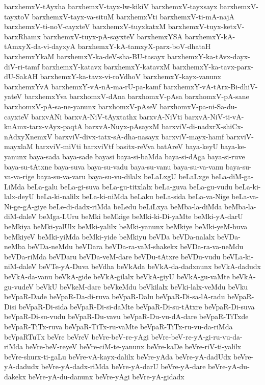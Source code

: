 {barxhemxV-tAyxha
barxhemxV-tayx-lw-kikiV
barxhemxV-tayxsayx
barxhemxV-tayxtoV
barxhemxV-tayx-va-situM
barxhemxVti
barxhemxV-ti-mA-najA
barxhemxV-ti-noV-cayxteV
barxhemxV-tuyxkatxM
barxhemxV-tuyx-ketxV-barxRhamx
barxhemxV-tuyx-pA-sayxteV
barxhemxYSA
barxhemxY-kA-tAmxyX-da-vi-dayxyA
barxhemxY-kA-tamxyX-parx-boV-dhataH
barxhemxYkaM
barxhemxY-ka-deV-sha-BU-tasayx
barxhemxY-ka-tAvx-dayx-diV-ri-tamf
barxhemxY-katavx
barxhemxY-katavxM
barxhemxY-ka-tavx-parx-dU-SakAH
barxhemxY-ka-tavx-vi-roVdhoV
barxhemxY-kayx-vanunx
barxhemxYvA
barxhemxY-vA-nA-ma-rU-pa-kamf
barxhemxY-vA-tArx-Bi-dhiV-yateV
barxhemxYva
barxhomxV-dAna
barxhomxV-pAsa
barxhomxV-pA-sane
barxhomxV-pA-sa-ne-yanunx
barxhomxV-pAseV
barxhomxV-pa-ni-Sa-du-cayxteV
barxvANi
barxvA-NiV-tAyxtathx
barxvA-NiVti
barxvA-NiV-ti-vA-knAmx-tarx-vAyx-paqtA
barxvA-Nuyx-pAsayxM
barxviV-di-nadxrX-shiCx-nAdxyXnemxV
barxviV-divx-tatx-sA-dha-nasayx
barxviV-mayx-hamf
barxviV-mayxlaM
barxviV-miVti
barxviVtf
basitx-reVva
batAreV
baya-keyU
baya-ke-yanunx
baya-sada
baya-sade
bayasi
baya-si-baMda
baya-si-dAga
baya-si-ruve
baya-su-tAtxne
baya-suva
baya-su-vadu
baya-su-vanu
baya-su-va-vanu
baya-su-va-va-rige
baya-su-va-varu
baya-su-vu-dilalx
beLaLxgU
beLaLxge
beLa-diM-ga-LiMda
beLa-galu
beLa-gi-suva
beLa-gu-titxlalx
beLa-guva
beLa-gu-vudu
beLa-ki-lalx-deyU
beLa-ki-nalilx
beLa-ki-niMda
beLaku
beLa-sida
beLa-va-Nige
beLa-va-Ni-ge-gA-giye
beLe-di-dadx-riMda
beLedu
beLiLxya
beMba-la-diMda
beMba-la-diM-daleV
beMga-LUru
beMki
beMkige
beMki-ki-Di-yaMte
beMki-yA-darU
beMkiya
beMki-yalUlx
beMki-yalilx
beMki-yanunx
beMkiye
beMki-yeM-buva
beMkiyeV
beMki-yiMda
beMki-yide
beMkiyu
beVDa
beVDa-nalalx
beVDa-neMba
beVDa-neMdu
beVDara
beVDa-ra-vaM-shakekx
beVDa-ra-va-neMdu
beVDa-riMda
beVDaru
beVDa-veM-dare
beVDu-tAtxre
beVDu-vudu
beVLa-ki-niM-daleV
beVTe-yA-Duva
beVdha
beVkAda
beVkA-da-dadxnunx
beVkA-dadudx
beVkA-da-vanu
beVkA-gide
beVkA-gilalx
beVkA-giyU
beVkA-gu-vaMte
beVkA-gu-vudeV
beVkU
beVkeM-dare
beVkeMdu
beVkilalx
beVki-lalx-veMdu
beVku
beVpaR-Dade
beVpaR-Da-di-ruva
beVpaR-Dalu
beVpaR-Di-sa-lA-radu
beVpaR-Disi
beVpaR-Di-sida
beVpaR-Di-si-daMte
beVpaR-Di-su-tAtxre
beVpaR-Di-suva
beVpaR-Di-su-vudu
beVpaR-Du-vavu
beVpaR-Du-vu-dA-dare
beVpaR-TiTxde
beVpaR-TiTx-ruva
beVpaR-TiTx-ru-vaMte
beVpaR-TiTx-ru-vu-da-riMda
beVpaRTuTx
beVre
beVreV
beVre-beV-re-yAgi
beVre-beV-re-yA-gi-ru-vu-da-riMda
beVre-beV-reyeV
beVre-ciM-te-yanunx
beVre-kaDe
beVre-riV-ti-yalilx
beVre-shurx-ti-gaLu
beVre-vA-kayx-dalilx
beVre-yAda
beVre-yA-dadUdx
beVre-yA-dadudx
beVre-yA-dadx-riMda
beVre-yA-darU
beVre-yA-dare
beVre-yA-du-dakekx
beVre-yA-du-danunx
beVre-yAgi
beVre-yA-gidadx
}
